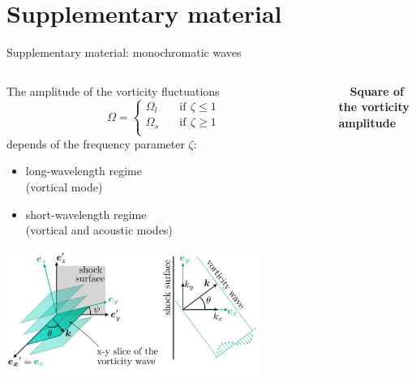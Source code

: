 \documentclass[9pt, aspectratio=1609]{beamer}
\newcommand{\colorgreen}[1]{{\color{greensfmc}{#1}}}
\newcommand{\colorred}[1]{{\color{redsfmc}{#1}}}
\begin{document}
\section*{Supplementary material}
\begin{frame}{\large Supplementary material: monochromatic waves}
    \begin{columns}[t]
    \begin{column}{.465\textwidth}%
        
        \vspace{-0.3cm}
        The amplitude of the vorticity fluctuations
        \begin{equation*}
            \Omega = \begin{cases}
                 \Omega_{l} \quad &\text{if} \,\ \zeta \leq 1  \\
                 \Omega_{s} \quad &\text{if} \,\ \zeta \geq 1 \\
            \end{cases}
        \end{equation*}
        depends of the frequency parameter $\zeta$:
        \begin{itemize}
            \item long-wavelength regime \colorgreen{$\zeta < 1$}\\ (vortical mode)
            \item short-wavelength regime \colorred{$\zeta > 1$}\\ (vortical and  acoustic modes)
        \end{itemize}
        
        \includegraphics[width=0.8\textwidth]{figures/huete2021/vorticity_wave.pdf}
        
    \end{column}%
    \begin{column}{.5\textwidth}%
        \begin{center}
            \textbf{$\quad$Square of the vorticity amplitude}
        \end{center}
        

\end{column}
\end{columns}
\end{frame}
\end{document}

